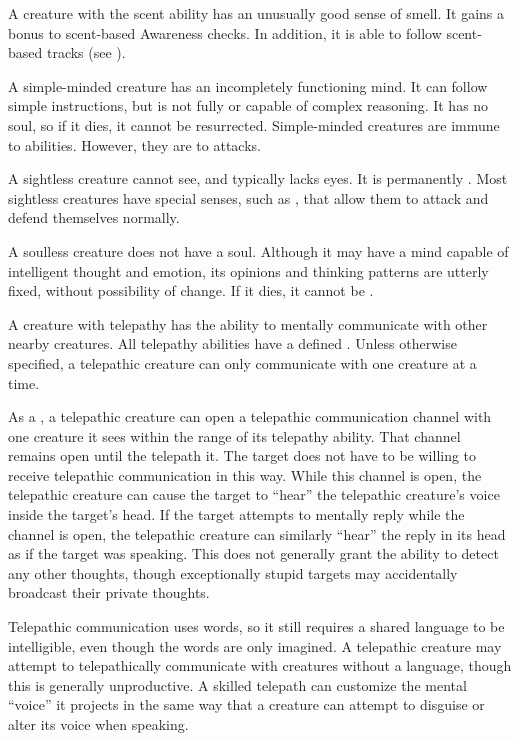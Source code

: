   A creature with the scent ability has an unusually good sense of smell.
  It gains a  bonus to scent-based Awareness checks.
  In addition, it is able to follow scent-based tracks (see ).

  A simple-minded creature has an incompletely functioning mind.
  It can follow simple instructions, but is not fully  or capable of complex reasoning.
  It has no soul, so if it dies, it cannot be resurrected.
  Simple-minded creatures are immune to  abilities.
  However, they are \vulnerable to  attacks.

  A sightless creature cannot see, and typically lacks eyes.
  It is permanently \blinded.
  Most sightless creatures have special senses, such as , that allow them to attack and defend themselves normally.

  A soulless creature does not have a soul.
  Although it may have a mind capable of intelligent thought and emotion, its opinions and thinking patterns are utterly fixed, without possibility of change.
  If it dies, it cannot be .

  A creature with telepathy has the ability to mentally communicate with other nearby creatures.
  All telepathy abilities have a defined .
  Unless otherwise specified, a telepathic creature can only communicate with one creature at a time.

  As a , a telepathic creature can open a telepathic communication channel with one creature it sees within the range of its telepathy ability.
  That channel remains open until the telepath  it.
  The target does not have to be willing to receive telepathic communication in this way.
  While this channel is open, the telepathic creature can cause the target to ``hear'' the telepathic creature's voice inside the target's head.
  If the target attempts to mentally reply while the channel is open, the telepathic creature can similarly ``hear'' the reply in its head as if the target was speaking.
  This does not generally grant the ability to detect any other thoughts, though exceptionally stupid targets may accidentally broadcast their private thoughts.

  Telepathic communication uses words, so it still requires a shared language to be intelligible, even though the words are only imagined.
  A telepathic creature may attempt to telepathically communicate with creatures without a language, though this is generally unproductive.
  A skilled telepath can customize the mental ``voice'' it projects in the same way that a creature can attempt to disguise or alter its voice when speaking.

